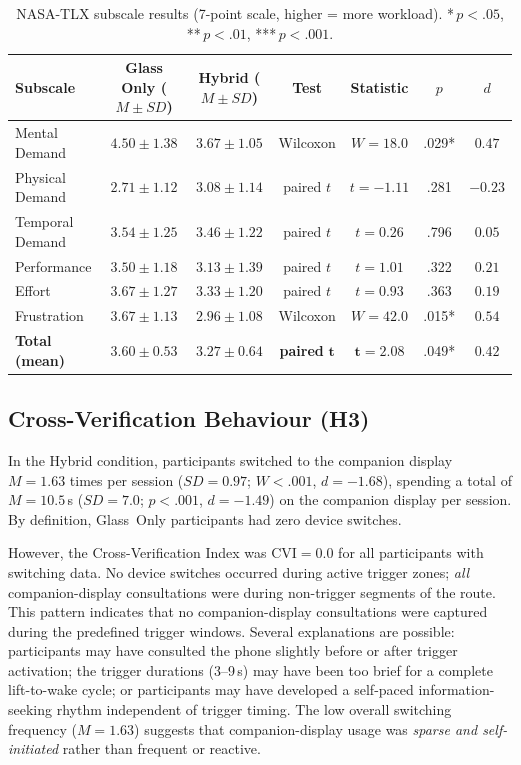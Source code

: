 \documentclass[review]{vgtc}           %
\begin{document}
\begin{table}[t]
  \centering
  \caption{NASA-TLX subscale results (7-point scale, higher = more workload). {*}\,$p < .05$, {**}\,$p < .01$, {***}\,$p < .001$.}
  \label{tab:tlx}
  \small
  \begin{tabular}{lcccccc}
    \toprule
    Subscale & Glass Only ($M \pm SD$) & Hybrid ($M \pm SD$) & Test & Statistic & $p$ & $d$ \\
    \midrule
    Mental Demand   & $4.50 \pm 1.38$ & $3.67 \pm 1.05$ & Wilcoxon & $W = 18.0$ & .029{*} & $0.47$ \\
    Physical Demand & $2.71 \pm 1.12$ & $3.08 \pm 1.14$ & paired $t$ & $t = -1.11$ & .281 & $-0.23$ \\
    Temporal Demand & $3.54 \pm 1.25$ & $3.46 \pm 1.22$ & paired $t$ & $t = 0.26$ & .796 & $0.05$ \\
    Performance     & $3.50 \pm 1.18$ & $3.13 \pm 1.39$ & paired $t$ & $t = 1.01$ & .322 & $0.21$ \\
    Effort          & $3.67 \pm 1.27$ & $3.33 \pm 1.20$ & paired $t$ & $t = 0.93$ & .363 & $0.19$ \\
    Frustration     & $3.67 \pm 1.13$ & $2.96 \pm 1.08$ & Wilcoxon & $W = 42.0$ & .015{*} & $0.54$ \\
    \midrule
    \textbf{Total (mean)} & $\mathbf{3.60 \pm 0.53}$ & $\mathbf{3.27 \pm 0.64}$ & \textbf{paired} $\boldsymbol{t}$ & $\boldsymbol{t = 2.08}$ & $\boldsymbol{.049}${*} & $\boldsymbol{0.42}$ \\
    \bottomrule
  \end{tabular}
\end{table}

\subsection{Cross-Verification Behaviour (H3)}

In the Hybrid condition, participants switched to the companion
display $M = 1.63$ times per session ($SD = 0.97$; $W < .001$,
$d = -1.68$), spending a total of $M = 10.5$\,s ($SD = 7.0$;
$p < .001$, $d = -1.49$) on the companion display per session. By
definition, Glass~Only participants had zero device switches.

However, the Cross-Verification Index was $\text{CVI} = 0.0$ for all
participants with switching data. No device switches occurred during
active trigger zones; \emph{all} companion-display consultations
were during non-trigger segments of the route. This pattern indicates
that no companion-display consultations were captured during the
predefined trigger windows. Several explanations are possible:
participants may have consulted the phone slightly before or after
trigger activation; the trigger durations (3--9\,s) may have been
too brief for a complete lift-to-wake cycle; or participants may have
developed a self-paced information-seeking rhythm independent of
trigger timing. The low overall switching frequency ($M = 1.63$)
suggests that companion-display usage was \emph{sparse and
self-initiated} rather than frequent or reactive.
\end{document}
